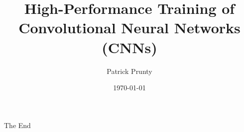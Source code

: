 \documentclass{beamer}
\title{High-Performance Training of Convolutional Neural Networks (CNNs)}
\author{Patrick Prunty}
\date{\today}
\begin{document}
    \maketitle

    
    
    
    
    


    \begin{frame}
        \huge{\centerline{The End}}
    \end{frame}
\end{document}
